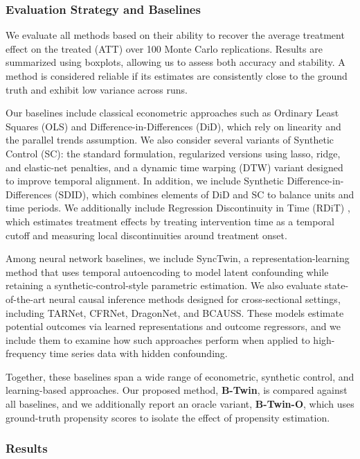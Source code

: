 \documentclass[10pt]{article} %
\begin{document}
\subsubsection*{Evaluation Strategy and Baselines}
We evaluate all methods based on their ability to recover the average treatment effect on the treated (ATT) over 100 Monte Carlo replications. Results are summarized using boxplots, allowing us to assess both accuracy and stability. A method is considered reliable if its estimates are consistently close to the ground truth and exhibit low variance across runs.

Our baselines include classical econometric approaches such as Ordinary Least Squares (OLS) and Difference-in-Differences (DiD), which rely on linearity and the parallel trends assumption. We also consider several variants of Synthetic Control (SC): the standard formulation, regularized versions using lasso, ridge, and elastic-net penalties, and a dynamic time warping (DTW) variant designed to improve temporal alignment. In addition, we include Synthetic Difference-in-Differences (SDID), which combines elements of DiD and SC to balance units and time periods. {We additionally include Regression Discontinuity in Time (RDiT) \citep{RDiT}, which estimates treatment effects by treating intervention time as a temporal cutoff and measuring local discontinuities around treatment onset.}

Among neural network baselines, we include SyncTwin, a representation-learning method that uses temporal autoencoding to model latent confounding while retaining a synthetic-control-style parametric estimation. We also evaluate state-of-the-art neural causal inference methods designed for cross-sectional settings, including TARNet, CFRNet, DragonNet, and BCAUSS. These models estimate potential outcomes via learned representations and outcome regressors, and we include them to examine how such approaches perform when applied to high-frequency time series data with hidden confounding.

Together, these baselines span a wide range of econometric, synthetic control, and learning-based approaches. Our proposed method, \textbf{B-Twin}, is compared against all baselines, and we additionally report an oracle variant, \textbf{B-Twin-O}, which uses ground-truth propensity scores to isolate the effect of propensity estimation.

 \subsubsection*{Results}
\end{document}
